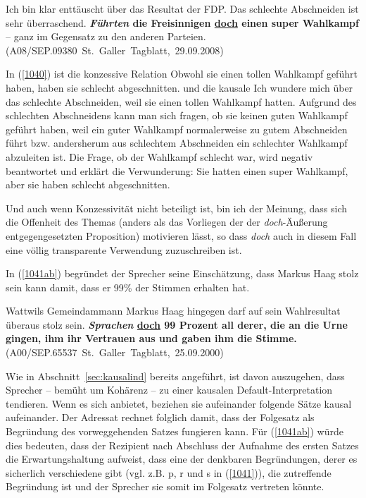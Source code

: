 {\begin{exe}
	\ex\label{1040} 
	\scriptsize
	Ich bin klar enttäuscht über das Resultat der FDP. Das schlechte Abschneiden ist sehr überraschend. \textbf{\textit{Führten} die Freisinnigen 				\underline{doch} einen super Wahlkampf} – ganz im Gegensatz zu den anderen Parteien. 
	\hfill\hbox {(A08/SEP.09380 St. Galler Tagblatt, 29.09.2008)}
\end{exe}
In (\ref{1040}) ist die konzessive Relation \glq Obwohl sie einen tollen Wahlkampf geführt haben, haben sie schlecht abgeschnitten.\grq {} und die kausale \glq Ich wundere mich über das schlechte Abschneiden, weil sie einen tollen Wahlkampf hatten.\grq {} Aufgrund des schlechten Abschneidens kann man sich fragen, ob sie keinen guten Wahlkampf geführt haben, weil ein guter Wahlkampf normalerweise zu gutem Abschneiden führt bzw. andersherum aus schlechtem Abschneiden ein schlechter Wahlkampf abzuleiten ist. Die Frage, ob der Wahlkampf schlecht war, wird negativ beantwortet und erklärt die Verwunderung: Sie hatten einen super Wahlkampf, aber sie haben schlecht abgeschnitten.

Und auch wenn Konzessivität nicht beteiligt ist, bin ich der Meinung, dass sich die Offenheit des Themas (anders als das Vorliegen der der \textit{doch}-Äußerung entgegengesetzten Proposition) motivieren lässt, so dass \textit{doch} auch in diesem Fall eine völlig transparente Verwendung zuzuschreiben ist.

In (\ref{1041ab}) begründet der Sprecher seine Einschätzung, dass Markus Haag stolz sein kann damit, dass er 99\% der Stimmen erhalten hat.

\begin{exe}
	\ex\label{1041ab} 
	\scriptsize
	Wattwils Gemeindammann Markus Haag hingegen darf auf sein Wahlresultat überaus stolz sein. \textbf{\textit{Sprachen} \underline{doch} 99 Prozent all 		derer, die an die Urne gingen, ihm ihr Vertrauen aus und gaben ihm die Stimme.}
	\hfill\hbox {(A00/SEP.65537 St. Galler Tagblatt, 25.09.2000)}
\end{exe}
Wie in Abschnitt~\ref{sec:kausalind} bereits angeführt, ist davon auszugehen, dass Sprecher – bemüht um Kohärenz – zu einer kausalen Default-Interpretation  tendieren. Wenn es sich anbie\-tet, beziehen sie aufeinander folgende Sätze kausal aufeinander. Der Adressat rechnet folglich damit, dass der Folgesatz als Begründung des vorweggehenden Satzes fungieren kann. Für (\ref{1041ab}) würde dies bedeuten, dass der Rezipient nach Abschluss der Aufnahme des ersten Satzes die Erwartungshaltung aufweist, dass eine der denkbaren Begründungen, derer es sicherlich verschiedene gibt (vgl. z.B. p, r und s in (\ref{1041})), die zutreffende Begründung ist und der Sprecher sie somit im Folgesatz vertreten könnte.

}

